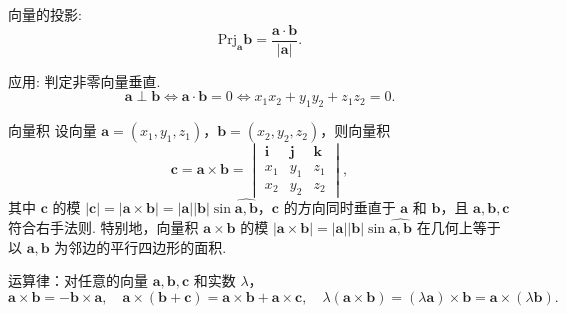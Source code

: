  \begin{zs}
向量的投影:
\[
\text{Prj}_{\boldsymbol{a}} \boldsymbol{b} = \frac{\boldsymbol{a} \cdot \boldsymbol{b}}{|\boldsymbol{a}|}.
\]
\end{zs}
 \begin{zs}
应用: 判定非零向量垂直.
\[
\boldsymbol{a} \perp \boldsymbol{b} \Leftrightarrow \boldsymbol{a} \cdot \boldsymbol{b} = 0 \Leftrightarrow x_1x_2 + y_1y_2 + z_1z_2 = 0.
\]
\end{zs}
\begin{dl}{ 向量积}{}
设向量 $\boldsymbol{a} = (x_1,y_1,z_1)$，$\boldsymbol{b} = (x_2,y_2,z_2)$，则向量积
\[
\boldsymbol{c} = \boldsymbol{a} \times \boldsymbol{b} =
\begin{vmatrix}
\boldsymbol{i} & \boldsymbol{j} & \boldsymbol{k} \\
x_1 & y_1 & z_1 \\
x_2 & y_2 & z_2
\end{vmatrix},
\]
其中 $\boldsymbol{c}$ 的模 $|\boldsymbol{c}| = |\boldsymbol{a} \times \boldsymbol{b}| = |\boldsymbol{a}||\boldsymbol{b}|\sin\widehat{\boldsymbol{a},\boldsymbol{b}}$，$\boldsymbol{c}$ 的方向同时垂直于 $\boldsymbol{a}$ 和 $\boldsymbol{b}$，且 $\boldsymbol{a},\boldsymbol{b},\boldsymbol{c}$ 符合右手法则. 特别地，向量积 $\boldsymbol{a} \times \boldsymbol{b}$ 的模 $|\boldsymbol{a} \times \boldsymbol{b}| = |\boldsymbol{a}||\boldsymbol{b}|\sin\widehat{\boldsymbol{a},\boldsymbol{b}}$ 在几何上等于以 $\boldsymbol{a},\boldsymbol{b}$ 为邻边的平行四边形的面积.
\end{dl}
\begin{center}
\end{center}
\begin{zs}
	    运算律：对任意的向量 $\boldsymbol{a},\boldsymbol{b},\boldsymbol{c}$ 和实数 $\lambda$，
\[
\boldsymbol{a} \times \boldsymbol{b} = -\boldsymbol{b} \times \boldsymbol{a},\quad
\boldsymbol{a} \times (\boldsymbol{b} + \boldsymbol{c}) = \boldsymbol{a} \times \boldsymbol{b} + \boldsymbol{a} \times \boldsymbol{c},\quad
\lambda(\boldsymbol{a} \times \boldsymbol{b}) = (\lambda\boldsymbol{a}) \times \boldsymbol{b} = \boldsymbol{a} \times (\lambda\boldsymbol{b}).
\]
\end{zs}
